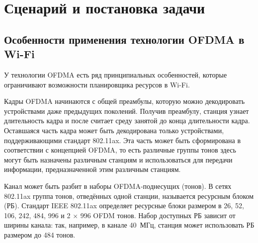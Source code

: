 \section{Сценарий и постановка задачи}
\label{sec:scenario}

\subsection{Особенности применения технологии OFDMA в Wi-Fi}

У технологии OFDMA есть ряд принципиальных особенностей, которые ограничивают возможности планировщика ресурсов в Wi-Fi.

Кадры OFDMA начинаются с общей преамбулы, которую можно декодировать устройствами даже предыдущих поколений. 
Получив преамбулу, станция узнает длительность кадра и после считает среду занятой до конца длительности кадра. Оставшаяся часть кадра может быть декодирована только устройствами, поддерживающими стандарт 802.11ax. 
Эта часть может быть сформирована в соответствии с концепцией OFDMA, то есть различные группы тонов здесь могут быть назначены различным станциям и использоваться для передачи информации, предназначенной этим различным станциям.

Канал может быть разбит в наборы OFDMA-поднесущих (тонов). 
В сетях 802.11ax группа тонов, отведённых одной станции, называется ресурсным блоком (РБ). Стандарт IEEE 802.11ax определяет ресурсные блоки размером в 26, 52, 106, 242, 484, 996 и 2 $\times$ 996 OFDM тонов.
Набор доступных РБ зависит от ширины канала: так, например, в канале 40~МГц, станция может использовать РБ размером до 484 тонов. 

